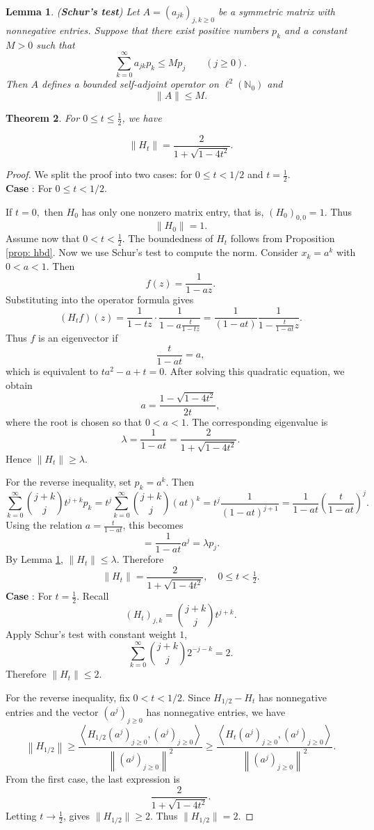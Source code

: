 \documentclass[12pt, reqno]{amsart}
\numberwithin{equation}{section}
\newtheorem{theorem}{Theorem}[section]
\newtheorem{lemma}[theorem]{Lemma}
\begin{document}
\begin{lemma}(\textbf{Schur's test})
  \label{lem:Schur}
Let \(A=(a_{jk})_{j,k\geq0}\) be a symmetric matrix with nonnegative
entries.  Suppose that there exist positive numbers \(p_k\) and a
constant \(M>0\) such that
\[
\sum_{k=0}^{\infty}a_{jk}p_k
\leq
Mp_j
\qquad(j\geq0).
\]
Then \(A\) defines a bounded self-adjoint operator on
\(\ell^2(\mathbb N_0)\) and
\[
\|A\|\leq M.
\]
\end{lemma}


\begin{theorem} \label{Thm:HO}
For $0 \le t \leq \tfrac{1}{2}$, we have

\[
\|{H}_t\| = \frac{2}{1+\sqrt{1-4t^2}}.
\]
\end{theorem}

\begin{proof}
We split the proof into two cases: for $0\leq t<1/2$ and $t=\frac{1}{2}$.\\
\textbf{Case} :  For $0\leq t<1/2$.

If $t=0,$ then \(H_0\) has only one nonzero matrix entry, that is, $(H_0)_{0,0}=1.$ Thus
\[
\|H_0\|=1.
\]
Assume now that $0<t<\frac{1}{2}.$
The boundedness of $H_t$ follows from Proposition \ref{prop: hbd}. Now we use Schur's test to compute the norm.
Consider $x_k=a^k$ with $0< a<1$. Then
\[
f(z)=\frac{1}{1-az}.
\]
Substituting into the operator formula gives
\[
(H_t f)(z)
= \frac{1}{1-tz}\cdot \frac{1}{1-a\frac{t}{1-tz}}
= \frac{1}{(1-at)}\frac{1}{1-\frac{t}{1-at}z}.
\]
Thus $f$ is an eigenvector if
\[
\frac{t}{1-at}=a,
\]
which is equivalent to $t a^2 - a + t = 0.$
After solving this quadratic equation, we obtain
\[
a=\frac{1-\sqrt{1-4t^2}}{2t},
\]
where the root is chosen so that $0< a<1$. The corresponding eigenvalue is
\[
\lambda=\frac{1}{1-at}
= \frac{2}{1+\sqrt{1-4t^2}}.
\]
Hence $\|H_t\|\ge \lambda$.

For the reverse inequality, set $p_k=a^k$. Then
\[
\sum_{k=0}^{\infty} \binom{j+k}{j} t^{j+k} p_k
= t^j \sum_{k=0}^{\infty} \binom{j+k}{j} (at)^k
= t^j \frac{1}{(1-at)^{j+1}}
= \frac{1}{1-at} \left(\frac{t}{1-at}\right)^j.
\]
Using the relation $a=\frac{t}{1-at}$, this becomes
\[
= \frac{1}{1-at} a^j = \lambda p_j.
\]
By Lemma \ref{lem:Schur}, $\|H_t\|\le \lambda$. Therefore
\[
\|H_t\| = \frac{2}{1+\sqrt{1-4t^2}}, \quad 0 \le t < \tfrac12.
\]
\textbf{Case} : For $t=\frac{1}{2}.$
Recall \[
(H_t)_{j,k}=\binom{j+k}{j}t^{j+k}.
\]
Apply Schur's test with constant weight $1$,
\[
\sum_{k=0}^{\infty}\binom{j+k}{j}2^{-j-k}=2.
\]
Therefore  $\|H_t\|\leq2.$

For the reverse inequality, fix \(0<t<1/2\). Since \(H_{1/2}-H_t\) has nonnegative entries and the vector $(a^j)_{j\geq0}$ has nonnegative entries, we have
\[
\left\|H_{1/2}\right\|
\geq
\frac{\left\langle H_{1/2}(a^j)_{j\geq 0},(a^j)_{j\geq 0}\right\rangle}
{\left\|(a^j)_{j\geq 0}\right\|^2}
\geq
\frac{\left\langle H_t(a^j)_{j\geq 0},(a^j)_{j\geq 0}\right\rangle}
{\left\|(a^j)_{j\geq 0}\right\|^2}.
\]
From the first case, the last expression is
\[
\frac{2}{1+\sqrt{1-4t^2}}.
\]
Letting $t\to \frac{1}{2}$, gives $\|H_{1/2}\|\geq2.$ Thus $\|H_{1/2}\|=2.$
\end{proof}
\end{document}
